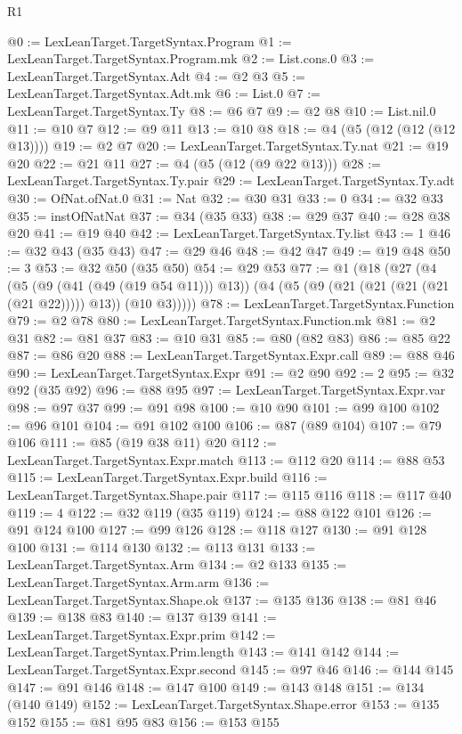 \begin{lexlean}{R1}
\begin{coremodule}
@0 := LexLeanTarget.TargetSyntax.Program
@1 := LexLeanTarget.TargetSyntax.Program.mk
@2 := List.cons.{0}
@3 := LexLeanTarget.TargetSyntax.Adt
@4 := @2 @3
@5 := LexLeanTarget.TargetSyntax.Adt.mk
@6 := List.{0}
@7 := LexLeanTarget.TargetSyntax.Ty
@8 := @6 @7
@9 := @2 @8
@10 := List.nil.{0}
@11 := @10 @7
@12 := @9 @11
@13 := @10 @8
@18 := @4 (@5 (@12 (@12 (@12 @13))))
@19 := @2 @7
@20 := LexLeanTarget.TargetSyntax.Ty.nat
@21 := @19 @20
@22 := @21 @11
@27 := @4 (@5 (@12 (@9 @22 @13)))
@28 := LexLeanTarget.TargetSyntax.Ty.pair
@29 := LexLeanTarget.TargetSyntax.Ty.adt
@30 := OfNat.ofNat.{0}
@31 := Nat
@32 := @30 @31
@33 := 0
@34 := @32 @33
@35 := instOfNatNat
@37 := @34 (@35 @33)
@38 := @29 @37
@40 := @28 @38 @20
@41 := @19 @40
@42 := LexLeanTarget.TargetSyntax.Ty.list
@43 := 1
@46 := @32 @43 (@35 @43)
@47 := @29 @46
@48 := @42 @47
@49 := @19 @48
@50 := 3
@53 := @32 @50 (@35 @50)
@54 := @29 @53
@77 := @1
    (@18
      (@27
        (@4
          (@5 (@9 (@41 (@49 (@19 @54 @11))) @13))
          (@4 (@5 (@9 (@21 (@21 (@21 (@21 (@21 @22))))) @13)) (@10 @3)))))
@78 := LexLeanTarget.TargetSyntax.Function
@79 := @2 @78
@80 := LexLeanTarget.TargetSyntax.Function.mk
@81 := @2 @31
@82 := @81 @37
@83 := @10 @31
@85 := @80 (@82 @83)
@86 := @85 @22
@87 := @86 @20
@88 := LexLeanTarget.TargetSyntax.Expr.call
@89 := @88 @46
@90 := LexLeanTarget.TargetSyntax.Expr
@91 := @2 @90
@92 := 2
@95 := @32 @92 (@35 @92)
@96 := @88 @95
@97 := LexLeanTarget.TargetSyntax.Expr.var
@98 := @97 @37
@99 := @91 @98
@100 := @10 @90
@101 := @99 @100
@102 := @96 @101
@104 := @91 @102 @100
@106 := @87 (@89 @104)
@107 := @79 @106
@111 := @85 (@19 @38 @11) @20
@112 := LexLeanTarget.TargetSyntax.Expr.match
@113 := @112 @20
@114 := @88 @53
@115 := LexLeanTarget.TargetSyntax.Expr.build
@116 := LexLeanTarget.TargetSyntax.Shape.pair
@117 := @115 @116
@118 := @117 @40
@119 := 4
@122 := @32 @119 (@35 @119)
@124 := @88 @122 @101
@126 := @91 @124 @100
@127 := @99 @126
@128 := @118 @127
@130 := @91 @128 @100
@131 := @114 @130
@132 := @113 @131
@133 := LexLeanTarget.TargetSyntax.Arm
@134 := @2 @133
@135 := LexLeanTarget.TargetSyntax.Arm.arm
@136 := LexLeanTarget.TargetSyntax.Shape.ok
@137 := @135 @136
@138 := @81 @46
@139 := @138 @83
@140 := @137 @139
@141 := LexLeanTarget.TargetSyntax.Expr.prim
@142 := LexLeanTarget.TargetSyntax.Prim.length
@143 := @141 @142
@144 := LexLeanTarget.TargetSyntax.Expr.second
@145 := @97 @46
@146 := @144 @145
@147 := @91 @146
@148 := @147 @100
@149 := @143 @148
@151 := @134 (@140 @149)
@152 := LexLeanTarget.TargetSyntax.Shape.error
@153 := @135 @152
@155 := @81 @95 @83
@156 := @153 @155

\end{coremodule}
\end{lexlean}
